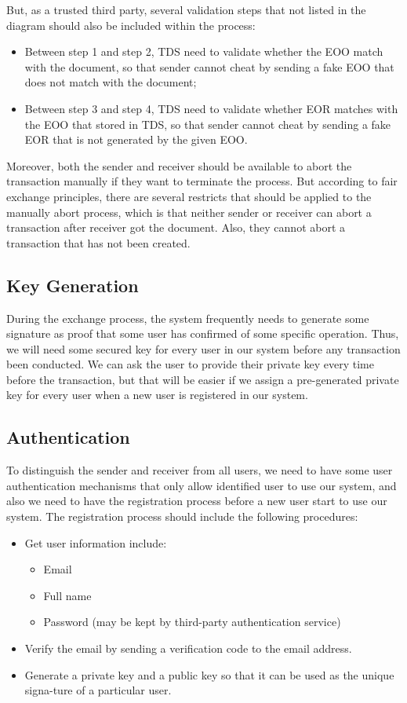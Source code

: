 \documentclass[runningheads]{llncs}
\begin{document}
But, as a trusted third party, several validation steps that not listed in the diagram should also be included within the process:

\begin{itemize}
	\item Between step 1 and step 2, TDS need to validate whether the EOO match with the document, so that sender cannot cheat by sending a fake EOO that does not match with the document;
	\item Between step 3 and step 4, TDS need to validate whether EOR matches with the EOO that stored in TDS, so that sender cannot cheat by sending a fake EOR that is not generated by the given EOO.
\end{itemize}

Moreover, both the sender and receiver should be available to abort the transaction manually if they want to terminate the process. But according to fair exchange principles, there are several restricts that should be applied to the manually abort process, which is that neither sender or receiver can abort a transaction after receiver got the document. Also, they cannot abort a transaction that has not been created.

\subsection{Key Generation}
During the exchange process, the system frequently needs to generate some signature as proof that some user has confirmed of some specific operation. Thus, we will need some secured key for every user in our system before any transaction been conducted. We can ask the user to provide their private key every time before the transaction, but that will be easier if we assign a pre-generated private key for every user when a new user is registered in our system.

\subsection{Authentication}
To distinguish the sender and receiver from all users, we need to have some user authentication mechanisms that only allow identified user to use our system, and also we need to have the registration process before a new user start to use our system. The registration process should include the following procedures:

\begin{itemize}
	\item Get user information include:
		\begin{itemize}
			\item Email
			\item Full name
			\item Password (may be kept by third-party authentication service)
		\end{itemize}
	\item Verify the email by sending a verification code to the email address.
	\item Generate a private key and a public key so that it can be used as the unique signa-ture of a particular user.
\end{itemize}
\end{document}
